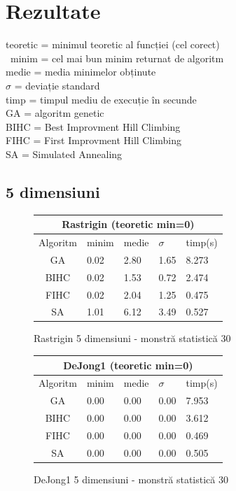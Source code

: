 \documentclass{article}
\begin{document}
\section{Rezultate}
teoretic = minimul teoretic al funcției (cel corect)\\\
minim = cel mai bun minim returnat de algoritm\\
medie = media minimelor obținute\\
$\sigma$ = deviație standard\\
timp = timpul mediu de execuție în secunde\\
GA = algoritm genetic\\
BIHC = Best Improvment Hill Climbing\\
FIHC = First Improvment Hill Climbing\\
SA = Simulated Annealing


\clearpage
\subsection{5 dimensiuni}

\begin{figure}[!h]
\begin{tabular}{||c|||l|l|l|l||}
  \hline
  \multicolumn{5}{||c||}{Rastrigin (teoretic min=0)} \\ \hline
  Algoritm & minim & medie & $\sigma$ & timp(s) \\ \hline \hline
  GA & 0.02 & 2.80 & 1.65 & 8.273 \\ \hline
  BIHC & 0.02 & 1.53 & 0.72 & 2.474\\ \hline
  FIHC & 0.02 & 2.04 & 1.25 & 0.475 \\ \hline
  SA & 1.01 & 6.12 & 3.49 & 0.527 \\ \hline
\end{tabular}
\caption{Rastrigin 5 dimensiuni - monstră statistică 30} 
\end{figure}

\begin{figure}[!h]
\begin{tabular}{||c|||l|l|l|l||}
  \hline
  \multicolumn{5}{||c||}{DeJong1 (teoretic min=0)} \\ \hline
  Algoritm & minim & medie & $\sigma$ & timp(s) \\ \hline \hline
  GA & 0.00 & 0.00 & 0.00 & 7.953 \\ \hline
  BIHC & 0.00 & 0.00 & 0.00 & 3.612\\ \hline
  FIHC & 0.00 & 0.00 & 0.00 & 0.469 \\ \hline
  SA & 0.00 & 0.00 & 0.00 & 0.505 \\ \hline
\end{tabular}
\caption{DeJong1 5 dimensiuni - monstră statistică 30} 
\end{figure}
\end{document}
